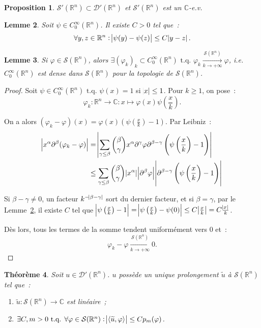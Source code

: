 \documentclass{report}
\newcommand{\C}{{\mathbb C}}
\newcommand{\R}{{\mathbb R}}
\newcommand{\scpr}[2]{\left\langle#1, #2\right\rangle}
\newcommand{\tq}{\text{ t.q. }}
\newcommand{\st}{\tq}
\newcommand{\pinfty}{{+\infty}}
\newtheorem{thm}{Théorème}[chapter]
\newtheorem{prp}[thm]{Proposition}
\newtheorem{lem}[thm]{Lemme}
\theoremstyle{definition}
\theoremstyle{remark}
\begin{document}
\begin{prp}\label{prp:distributions tempérées e.v.} $\mathcal S'(\R^n) \subset \mathcal D'(\R^n)$ et $\mathcal S'(\R^n)$ est un $\C$-e.v.
\end{prp}

\begin{lem}\label{lem:C^infty_0 Lipschitz} Soit $\psi \in C^\infty_0(\R^n)$. Il existe $C > 0$ tel que~:
\[\forall y, z \in \R^n : \abs {\psi(y)-\psi(z)} \leq C\abs {y-z}.\]
\end{lem}


\begin{lem}\label{lem:C infty 0 dense dans Schwartz} Si $\varphi \in \mathcal S(\R^n)$, alors
$\exists (\varphi_k)_k \subset C^\infty_0(\R^n) \st \varphi_k \xrightarrow[k \to \pinfty]{\mathcal S(\R^n)} \varphi$,
i.e. $C^\infty_0(\R^n)$ est dense dans $\mathcal S(\R^n)$ pour la topologie de $\mathcal S(\R^n)$.
\end{lem}

\begin{proof} Soit $\psi \in C^\infty_0(\R^n) \st \psi(x) = 1$ si $\abs x \leq 1$. Pour $k \geq 1$, on pose~:
\[\varphi_k : \R^n \to \C : x \mapsto \varphi(x)\psi\left(\frac xk\right).\]

On a alors $(\varphi_k-\varphi)(x) = \varphi(x)\left(\psi\left(\frac xk\right)-1\right)$. Par Leibniz~:
\begin{align*}
	\abs {x^\alpha\partial^\beta(\varphi_k-\varphi)}
	&= \abs {\sum_{\gamma \leq \beta}\binom \beta\gamma x^\alpha\partial^\gamma\varphi\partial^{\beta-\gamma}\left(\psi\left(\frac xk\right)-1\right)} \\
	&\leq \sum_{\gamma\leq\beta}\binom\beta\gamma\abs {x^\alpha}\abs {\partial^\beta\varphi}\abs {\partial^{\beta-\gamma}\left(\psi\left(\frac xk\right)-1\right)}
\end{align*}

Si $\beta - \gamma \neq 0$, un facteur $k^{-\abs{\beta-\gamma}}$ sort du dernier facteur, et si $\beta=\gamma$, par le Lemme~\ref{lem:C^infty_0 Lipschitz}, il existe $C$ tel que
$\abs {\psi\left(\frac xk\right)-1} = \abs {\psi\left(\frac xk\right) - \psi(0)} \leq C\abs {\frac xk} = C\frac {\abs x}k$.

Dès lors, tous les termes de la somme tendent uniformément vers 0 et~:
\[\varphi_k-\varphi \xrightarrow[k \to \pinfty]{\mathcal S(\R^n)} 0.\]
\end{proof}

\begin{thm} Soit $u \in \mathcal D'(\R^n)$. $u$ possède un unique prolongement $\widetilde u$ à $\mathcal S(\R^n)$ tel que~:
\begin{enumerate}
	\item $\widetilde u : \mathcal S(\R^n) \to \C$ est linéaire~;
	\item $\exists C, m > 0 \st \forall \varphi \in \mathcal S(\R^n) : \abs {\scpr {\widetilde u}\varphi} \leq Cp_m(\varphi)$.
\end{enumerate}
\end{thm}
\end{document}
